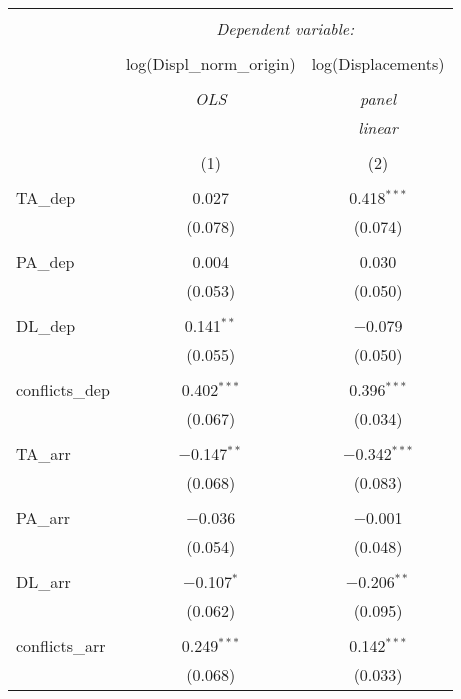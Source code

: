 
\begin{table}[!htbp] \centering 
  \caption{} 
  \label{} 
\begin{tabular}{@{\extracolsep{5pt}}lcc} 
\\[-1.8ex]\hline 
\hline \\[-1.8ex] 
 & \multicolumn{2}{c}{\textit{Dependent variable:}} \\ 
\cline{2-3} 
\\[-1.8ex] & log(Displ\_norm\_origin) & log(Displacements) \\ 
\\[-1.8ex] & \textit{OLS} & \textit{panel} \\ 
 & \textit{} & \textit{linear} \\ 
\\[-1.8ex] & (1) & (2)\\ 
\hline \\[-1.8ex] 
 TA\_dep & 0.027 & 0.418$^{***}$ \\ 
  & (0.078) & (0.074) \\ 
  & & \\ 
 PA\_dep & 0.004 & 0.030 \\ 
  & (0.053) & (0.050) \\ 
  & & \\ 
 DL\_dep & 0.141$^{**}$ & $-$0.079 \\ 
  & (0.055) & (0.050) \\ 
  & & \\ 
 conflicts\_dep & 0.402$^{***}$ & 0.396$^{***}$ \\ 
  & (0.067) & (0.034) \\ 
  & & \\ 
 TA\_arr & $-$0.147$^{**}$ & $-$0.342$^{***}$ \\ 
  & (0.068) & (0.083) \\ 
  & & \\ 
 PA\_arr & $-$0.036 & $-$0.001 \\ 
  & (0.054) & (0.048) \\ 
  & & \\ 
 DL\_arr & $-$0.107$^{*}$ & $-$0.206$^{**}$ \\ 
  & (0.062) & (0.095) \\ 
  & & \\ 
 conflicts\_arr & 0.249$^{***}$ & 0.142$^{***}$ \\ 
  & (0.068) & (0.033) \\ 

\end{tabular}
\end{table}
